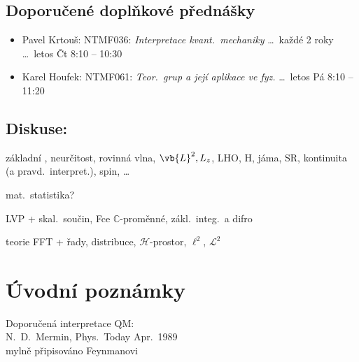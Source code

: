 \documentclass[11pt,a4paper]{article}
\begin{document}
\subsection*{Doporučené doplňkové přednášky}
\begin{itemize}[nosep]
  \item Pavel Krtouš: NTMF036: \emph{Interpretace kvant.\ mechaniky} \dots\ každé 2 roky \dots\ letos Čt 8:10 -- 10:30
  \item Karel Houfek: NTMF061: \emph{Teor.\ grup a její aplikace ve fyz.} \dots\ letos Pá 8:10 -- 11:20
\end{itemize}

\subsection*{Diskuse: }
základní , neurčitost, rovinná vlna, $\vb{L}^2, L_z$, LHO, H, jáma, SR, kontinuita (a pravd.\ interpret.), spin, \dots

 \quad mat.\ statistika?

LVP + skal.\ součin, Fce $\mathbb{C}$-proměnné, zákl.\ integ.\ a difro 

teorie FFT + řady, distribuce, $\mathcal{H}$-prostor, $\ell^2$, $\mathcal{L}^2$ 

\section{Úvodní poznámky}

Doporučená interpretace QM: \\
\quad {} \quad N.\ D.\ Mermin, Phys.\ Today Apr.\ 1989
 \\
mylně připisováno Feynmanovi 
\end{document}
